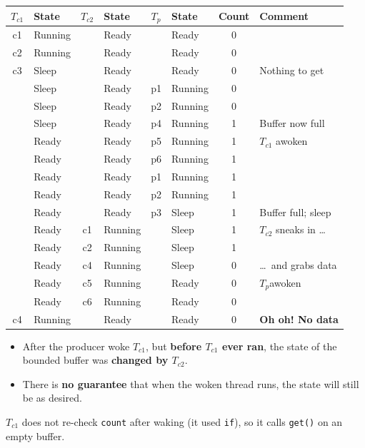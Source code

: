 \documentclass[11pt,a4paper]{article}
\newcommand{\Tc}[1]{\(T_{c#1}\)}
\newcommand{\Tp}{\(T_p\)}
\begin{document}
\begin{center}
\small
\renewcommand{\arraystretch}{1.05}
\setlength{\tabcolsep}{4.5pt}
\begin{tabular}{@{}clclclcl@{}}
  \toprule
  \Tc1 & \textbf{State} & \Tc2 & \textbf{State} & \Tp & \textbf{State} & \textbf{Count} & \textbf{Comment} \\
  \midrule
  c1 & Running &    & Ready   &    & Ready   & 0 & \\
  c2 & Running &    & Ready   &    & Ready   & 0 & \\
  c3 & Sleep   &    & Ready   &    & Ready   & 0 & Nothing to get \\
     & Sleep   &    & Ready   & p1 & Running & 0 & \\
     & Sleep   &    & Ready   & p2 & Running & 0 & \\
     & Sleep   &    & Ready   & p4 & Running & 1 & Buffer now full \\
     & Ready   &    & Ready   & p5 & Running & 1 & \Tc1 awoken \\
     & Ready   &    & Ready   & p6 & Running & 1 & \\
     & Ready   &    & Ready   & p1 & Running & 1 & \\
     & Ready   &    & Ready   & p2 & Running & 1 & \\
     & Ready   &    & Ready   & p3 & Sleep   & 1 & Buffer full; sleep \\
     & Ready   & c1 & Running &    & Sleep   & 1 & \Tc2 sneaks in \ldots \\
     & Ready   & c2 & Running &    & Sleep   & 1 & \\
     & Ready   & c4 & Running &    & Sleep   & 0 & \ldots\ and grabs data \\
     & Ready   & c5 & Running &    & Ready   & 0 & \Tp awoken \\
     & Ready   & c6 & Running &    & Ready   & 0 & \\
  c4 & Running &    & Ready   &    & Ready   & 0 & \textbf{Oh oh! No data} \\
  \bottomrule
\end{tabular}
\end{center}

\begin{warnbox}
\begin{itemize}
  \item After the producer woke \Tc1, but \textbf{before \Tc1 ever ran}, the
        state of the bounded buffer was \textbf{changed by \Tc2}.
  \item There is \textbf{no guarantee} that when the woken thread runs, the
        state will still be as desired.
\end{itemize}
\Tc1 does not re-check \texttt{count} after waking (it used \texttt{if}), so
it calls \texttt{get()} on an empty buffer.
\end{warnbox}
\end{document}
